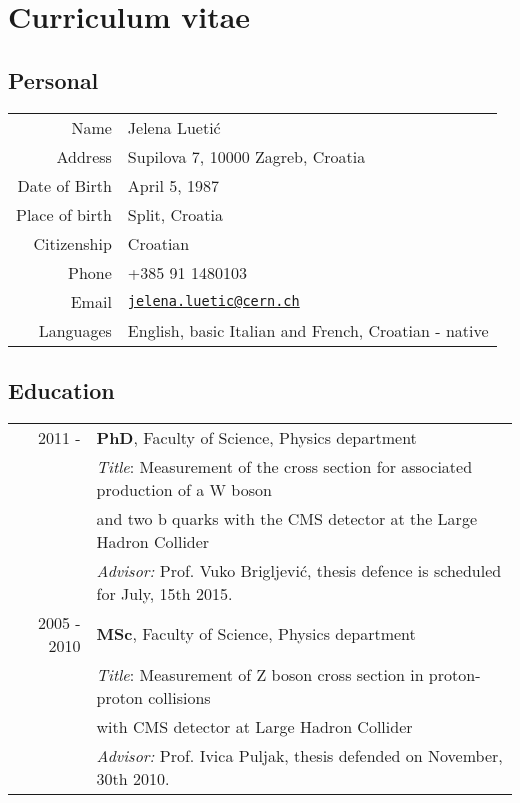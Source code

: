 \chapter*{Curriculum vitae}
\section*{Personal}


  \begin{tabular}{r|l}
    Name & Jelena Luetić \\
	Address & Supilova 7, 10000 Zagreb, Croatia \\   
    Date of Birth & April 5, 1987 \\
    Place of birth & Split, Croatia \\
    Citizenship & Croatian \\
    Phone & +385 91 1480103 \\
    Email & \href{mailto:jelena.luetic@cern.ch}{\tt jelena.luetic@cern.ch} \\
    Languages & English, basic Italian and French, Croatian - native \\
  \end{tabular}



\section*{Education}

\begin{table}[h!]
 \centering
\begin{tabular}{r | l}
2011 - & \textbf{PhD}, Faculty of Science, Physics department \\ & \textit{Title}: 
Measurement of the cross section for associated production of a W boson \\ & and two b quarks with the CMS detector at the Large Hadron Collider \\ &  \textit{Advisor:} Prof. Vuko Brigljević, thesis defence is scheduled for July, 15th 2015. \\[5pt] 
2005 - 2010 & \textbf{MSc}, Faculty of Science, Physics department \\  & \textit{Title}: Measurement of Z boson cross section in proton-proton collisions \\ & with CMS detector at Large Hadron Collider \\ &  \textit{Advisor:} Prof. Ivica Puljak, thesis defended on November, 30th 2010. \\ 
\end{tabular}
\end{table}


